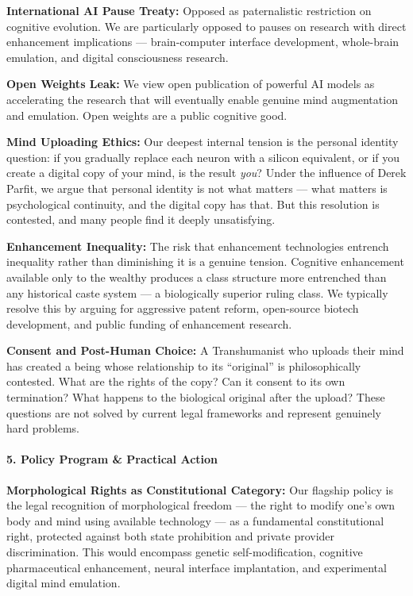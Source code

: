 \textbf{International AI Pause Treaty:} Opposed as paternalistic
restriction on cognitive evolution. We are particularly opposed to
pauses on research with direct enhancement implications ---
brain-computer interface development, whole-brain emulation, and digital
consciousness research.

\textbf{Open Weights Leak:} We view open publication of powerful AI
models as accelerating the research that will eventually enable genuine
mind augmentation and emulation. Open weights are a public cognitive
good.

\textbf{Mind Uploading Ethics:} Our deepest internal tension is the
personal identity question: if you gradually replace each neuron with a
silicon equivalent, or if you create a digital copy of your mind, is the
result \emph{you}? Under the influence of Derek Parfit, we argue that
personal identity is not what matters --- what matters is psychological
continuity, and the digital copy has that. But this resolution is
contested, and many people find it deeply unsatisfying.

\textbf{Enhancement Inequality:} The risk that enhancement technologies
entrench inequality rather than diminishing it is a genuine tension.
Cognitive enhancement available only to the wealthy produces a class
structure more entrenched than any historical caste system --- a
biologically superior ruling class. We typically resolve this by arguing
for aggressive patent reform, open-source biotech development, and
public funding of enhancement research.

\textbf{Consent and Post-Human Choice:} A Transhumanist who uploads
their mind has created a being whose relationship to its ``original'' is
philosophically contested. What are the rights of the copy? Can it
consent to its own termination? What happens to the biological original
after the upload? These questions are not solved by current legal
frameworks and represent genuinely hard problems.

\paragraph{5. Policy Program \& Practical
Action}\label{policy-program-practical-action-16}

\textbf{Morphological Rights as Constitutional Category:} Our flagship
policy is the legal recognition of morphological freedom --- the right
to modify one's own body and mind using available technology --- as a
fundamental constitutional right, protected against both state
prohibition and private provider discrimination. This would encompass
genetic self-modification, cognitive pharmaceutical enhancement, neural
interface implantation, and experimental digital mind emulation.

